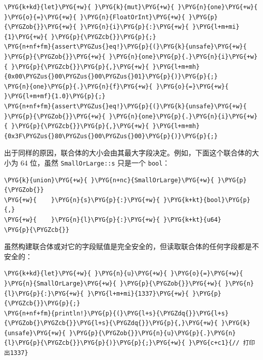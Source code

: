 \begin{Verbatim}[commandchars=\\\{\},breaklines=true,breakanywhere=true,fontsize=\codefont,xleftmargin=17bp]
\PYG{k+kd}{let}\PYG{+w}{ }\PYG{k}{mut}\PYG{+w}{ }\PYG{n}{one}\PYG{+w}{ }\PYG{o}{=}\PYG{+w}{ }\PYG{n}{FloatOrInt}\PYG{+w}{ }\PYG{p}{\PYGZob{}}\PYG{+w}{ }\PYG{n}{i}\PYG{p}{:}\PYG{+w}{ }\PYG{l+m+mi}{1}\PYG{+w}{ }\PYG{p}{\PYGZcb{}}\PYG{p}{;}
\PYG{n+nf+fm}{assert\PYGZus{}eq!}\PYG{p}{(}\PYG{k}{unsafe}\PYG{+w}{ }\PYG{p}{\PYGZob{}}\PYG{+w}{ }\PYG{n}{one}\PYG{p}{.}\PYG{n}{i}\PYG{+w}{ }\PYG{p}{\PYGZcb{}}\PYG{p}{,}\PYG{+w}{ }\PYG{l+m+mh}{0x00\PYGZus{}00\PYGZus{}00\PYGZus{}01}\PYG{p}{)}\PYG{p}{;}
\PYG{n}{one}\PYG{p}{.}\PYG{n}{f}\PYG{+w}{ }\PYG{o}{=}\PYG{+w}{ }\PYG{l+m+mf}{1.0}\PYG{p}{;}
\PYG{n+nf+fm}{assert\PYGZus{}eq!}\PYG{p}{(}\PYG{k}{unsafe}\PYG{+w}{ }\PYG{p}{\PYGZob{}}\PYG{+w}{ }\PYG{n}{one}\PYG{p}{.}\PYG{n}{i}\PYG{+w}{ }\PYG{p}{\PYGZcb{}}\PYG{p}{,}\PYG{+w}{ }\PYG{l+m+mh}{0x3F\PYGZus{}80\PYGZus{}00\PYGZus{}00}\PYG{p}{)}\PYG{p}{;}
\end{Verbatim}

出于同样的原因，联合体的大小会由其最大字段决定。例如，下面这个联合体的大小为 64 位，虽然 \texttt{SmallOrLarge::s} 只是一个 \texttt{bool}：

\begin{Verbatim}[commandchars=\\\{\},breaklines=true,breakanywhere=true,fontsize=\codefont,xleftmargin=17bp]
\PYG{k}{union}\PYG{+w}{ }\PYG{n+nc}{SmallOrLarge}\PYG{+w}{ }\PYG{p}{\PYGZob{}}
\PYG{+w}{    }\PYG{n}{s}\PYG{p}{:}\PYG{+w}{ }\PYG{k+kt}{bool}\PYG{p}{,}
\PYG{+w}{    }\PYG{n}{l}\PYG{p}{:}\PYG{+w}{ }\PYG{k+kt}{u64}
\PYG{p}{\PYGZcb{}}
\end{Verbatim}

虽然构建联合体或对它的字段赋值是完全安全的，但读取联合体的任何字段都是不安全的：

\begin{Verbatim}[commandchars=\\\{\},breaklines=true,breakanywhere=true,fontsize=\codefont,xleftmargin=17bp]
\PYG{k+kd}{let}\PYG{+w}{ }\PYG{n}{u}\PYG{+w}{ }\PYG{o}{=}\PYG{+w}{ }\PYG{n}{SmallOrLarge}\PYG{+w}{ }\PYG{p}{\PYGZob{}}\PYG{+w}{ }\PYG{n}{l}\PYG{p}{:}\PYG{+w}{ }\PYG{l+m+mi}{1337}\PYG{+w}{ }\PYG{p}{\PYGZcb{}}\PYG{p}{;}
\PYG{n+nf+fm}{println!}\PYG{p}{(}\PYG{l+s}{\PYGZdq{}}\PYG{l+s}{\PYGZob{}\PYGZcb{}}\PYG{l+s}{\PYGZdq{}}\PYG{p}{,}\PYG{+w}{ }\PYG{k}{unsafe}\PYG{+w}{ }\PYG{p}{\PYGZob{}}\PYG{n}{u}\PYG{p}{.}\PYG{n}{l}\PYG{p}{\PYGZcb{}}\PYG{p}{)}\PYG{p}{;}\PYG{+w}{ }\PYG{c+c1}{// 打印出1337}
\end{Verbatim}

